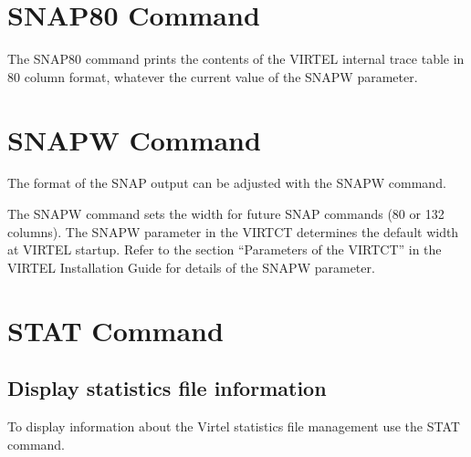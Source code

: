 \documentclass[letterpaper,10pt,english]{sphinxmanual}
\begin{document}

\section{SNAP80 Command}
\label{\detokenize{audit_operations_ and_performance:index-21}}\label{\detokenize{audit_operations_ and_performance:snap80-command}}
\begin{sphinxVerbatim}[commandchars=\\\{\}]
\end{sphinxVerbatim}

The SNAP80 command prints the contents of the VIRTEL internal trace table in 80 column format, whatever the current value of the SNAPW parameter.


\section{SNAPW Command}
\label{\detokenize{audit_operations_ and_performance:index-22}}\label{\detokenize{audit_operations_ and_performance:snapw-command}}
The format of the SNAP output can be adjusted with the SNAPW command.

\begin{sphinxVerbatim}[commandchars=\\\{\}]
  
\end{sphinxVerbatim}

The SNAPW command sets the width for future SNAP commands (80 or 132 columns). The SNAPW parameter in the VIRTCT determines the default width at VIRTEL startup. Refer to the section “Parameters of the VIRTCT” in the VIRTEL Installation Guide for details of the SNAPW parameter.


\section{STAT Command}
\label{\detokenize{audit_operations_ and_performance:index-23}}\label{\detokenize{audit_operations_ and_performance:stat-command}}

\subsection{Display statistics file information}
\label{\detokenize{audit_operations_ and_performance:display-statistics-file-information}}
To display information about the Virtel statistics file management use the STAT command.
\end{document}
